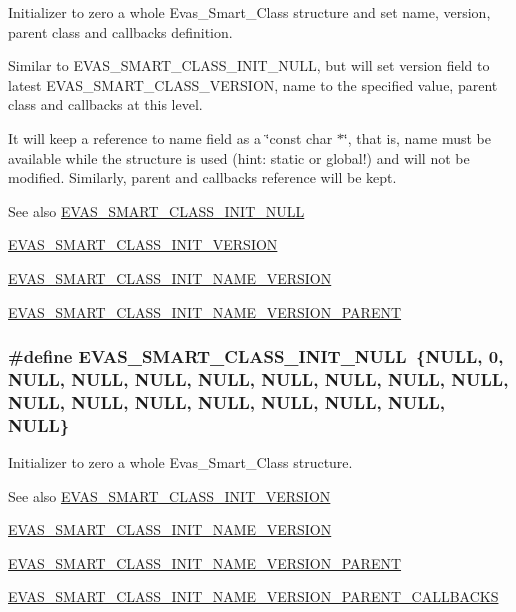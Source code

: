 Initializer to zero a whole Evas\_\-Smart\_\-Class structure and set name, version, parent class and callbacks definition. 

Similar to EVAS\_\-SMART\_\-CLASS\_\-INIT\_\-NULL, but will set version field to latest EVAS\_\-SMART\_\-CLASS\_\-VERSION, name to the specified value, parent class and callbacks at this level.

It will keep a reference to name field as a \char`\"{}const char $\ast$\char`\"{}, that is, name must be available while the structure is used (hint: static or global!) and will not be modified. Similarly, parent and callbacks reference will be kept.

\begin{DoxySeeAlso}{See also}
\hyperlink{group__Evas__Smart__Group_ga223f5d420c1e22275cd6490cd77c85f0}{EVAS\_\-SMART\_\-CLASS\_\-INIT\_\-NULL} 

\hyperlink{group__Evas__Smart__Group_gaaa610a135c79167162405b56cffe8562}{EVAS\_\-SMART\_\-CLASS\_\-INIT\_\-VERSION} 

\hyperlink{group__Evas__Smart__Group_gaff2bbd5bb79e51ad8d31f98106caff77}{EVAS\_\-SMART\_\-CLASS\_\-INIT\_\-NAME\_\-VERSION} 

\hyperlink{group__Evas__Smart__Group_ga653b7bf36c2c87bd38d8126e11a4671d}{EVAS\_\-SMART\_\-CLASS\_\-INIT\_\-NAME\_\-VERSION\_\-PARENT} 
\end{DoxySeeAlso}
\subsubsection[{EVAS\_\-SMART\_\-CLASS\_\-INIT\_\-NULL}]{\setlength{\rightskip}{0pt plus 5cm}\#define EVAS\_\-SMART\_\-CLASS\_\-INIT\_\-NULL~\{NULL, 0, NULL, NULL, NULL, NULL, NULL, NULL, NULL, NULL, NULL, NULL, NULL, NULL, NULL, NULL, NULL, NULL\}}\label{group__Evas__Smart__Group_ga223f5d420c1e22275cd6490cd77c85f0}


Initializer to zero a whole Evas\_\-Smart\_\-Class structure. 

\begin{DoxySeeAlso}{See also}
\hyperlink{group__Evas__Smart__Group_gaaa610a135c79167162405b56cffe8562}{EVAS\_\-SMART\_\-CLASS\_\-INIT\_\-VERSION} 

\hyperlink{group__Evas__Smart__Group_gaff2bbd5bb79e51ad8d31f98106caff77}{EVAS\_\-SMART\_\-CLASS\_\-INIT\_\-NAME\_\-VERSION} 

\hyperlink{group__Evas__Smart__Group_ga653b7bf36c2c87bd38d8126e11a4671d}{EVAS\_\-SMART\_\-CLASS\_\-INIT\_\-NAME\_\-VERSION\_\-PARENT} 

\hyperlink{group__Evas__Smart__Group_ga5ebe1775142621cc3b75a3c57085ec83}{EVAS\_\-SMART\_\-CLASS\_\-INIT\_\-NAME\_\-VERSION\_\-PARENT\_\-CALLBACKS} 
\end{DoxySeeAlso}
